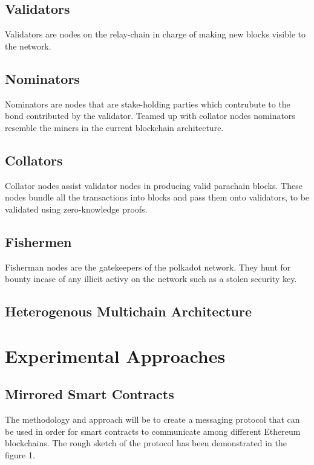 \documentclass[a4paper,twoside,phd]{BYUPhys}
\begin{document}
\section{Validators}
Validators are nodes on the relay-chain in charge of making new blocks visible to the network. 
\section{Nominators}
Nominators are nodes that are stake-holding parties which contrubute to the bond contributed by the validator. Teamed up with collator nodes nominators resemble the miners in the current blockchain architecture.
\section{Collators}
Collator nodes assist validator nodes in producing valid parachain blocks. These nodes bundle all the transactions into blocks and pass them onto validators, to be validated using zero-knowledge proofs.
\section{Fishermen}
Fisherman nodes are the gatekeepers of the polkadot network. They hunt for bounty incase of any illicit activy on the network such as a stolen security key.

\section{Heterogenous Multichain Architecture \label{sect:RelWorksingle-user}}

\chapter{Experimental Approaches}
\label{chap:Homogenous Multichain Architecture}


\section{Mirrored Smart Contracts}
The methodology and approach will be to create a messaging protocol that can be used in order for smart contracts to communicate among different Ethereum blockchains. The rough sketch of the protocol has been demonstrated in the figure 1.
\end{document}
